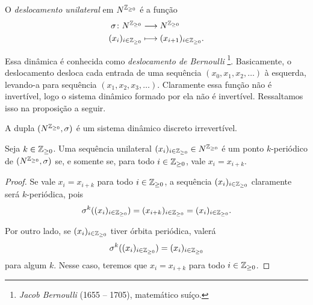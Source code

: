 \begin{definition}
O \emph{deslocamento unilateral} em $N^{\mathbb{Z}_{\geq 0}}$ é a função
	\begin{align*}
	{\sigma}\colon {N^{\mathbb{Z}_{\geq 0}}} &\longrightarrow {N^{\mathbb{Z}_{\geq 0}}} \\{(x_i)_{i \in \mathbb{Z}_{\geq 0}}} &\longmapsto (x_{i+1})_{i \in \mathbb{Z}_{\geq 0}}.
	\end{align*}
\end{definition}

 Essa dinâmica é conhecida como \emph{deslocamento de Bernoulli} \footnote{\emph{Jacob Bernoulli} (1655 -- 1705), matemático suíço.}. Basicamente, o deslocamento desloca cada entrada de uma sequência $(x_0,x_1,x_2,\ldots)$ à esquerda, levando-a para sequência $(x_1,x_2,x_3,\ldots)$. Claramente essa função não é invertível, logo o sistema dinâmico formado por ela não é invertível. Ressaltamos isso na proposição a seguir.

\begin{proposition}
A dupla $(N^{\mathbb{Z}_{\geq 0}},\sigma)$ é um sistema dinâmico discreto irrevertível.
\end{proposition}

\begin{proposition}
Seja $k \in \mathbb{Z}_{\geq 0}$. Uma sequência unilateral $(x_i)_{i \in \mathbb{Z}_{\geq 0}} \in N^{\mathbb{Z}_{\geq 0}}$ é um ponto $k$-periódico de $(N^{\mathbb{Z}_{\geq 0}},\sigma)$  se, e somente se, para todo $i \in \mathbb{Z}_{\geq 0}$, vale $x_i = x_{i+k}$.
\end{proposition}
\begin{proof}
Se vale $x_i = x_{i+k}$ para todo $i \in \mathbb{Z}_{\geq 0}$, a sequência $(x_i)_{i \in \mathbb{Z}_{\geq 0}}$ claramente será $k$-periódica, pois
	\begin{equation*}
	\sigma^k((x_i)_{i \in \mathbb{Z}_{\geq 0}}) = (x_{i+k})_{i \in \mathbb{Z}_{\geq 0}} = (x_i)_{i \in \mathbb{Z}_{\geq 0}}.
	\end{equation*}

Por outro lado, se $(x_i)_{i \in \mathbb{Z}_{\geq 0}}$ tiver órbita periódica, valerá
	\begin{equation*}
	\sigma^k((x_i)_{i \in \mathbb{Z}_{\geq 0}}) = (x_i)_{i \in \mathbb{Z}_{\geq 0}}
	\end{equation*}
para algum $k$. Nesse caso, teremos que $x_i = x_{i+k}$ para todo $i \in \mathbb{Z}_{\geq 0}$.
\end{proof}

